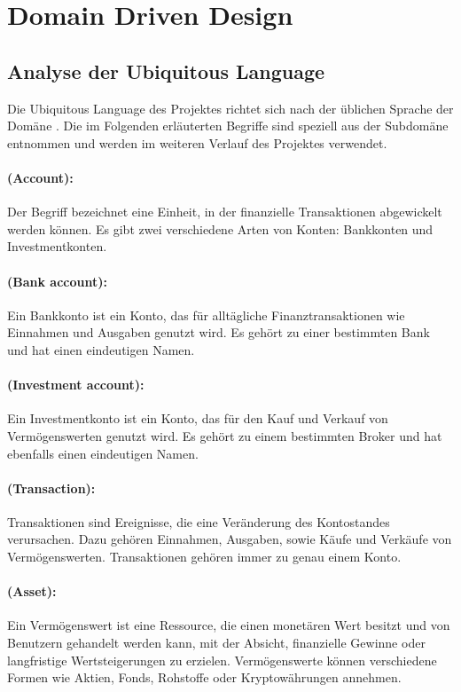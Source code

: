 \section{Domain Driven Design}

\subsection{Analyse der Ubiquitous Language}

Die Ubiquitous Language des Projektes richtet sich nach der üblichen Sprache der Domäne . Die im Folgenden erläuterten Begriffe sind speziell aus der Subdomäne  entnommen und werden im weiteren Verlauf des Projektes verwendet.

\paragraph*{ (Account):} Der Begriff bezeichnet eine Einheit, in der finanzielle Transaktionen abgewickelt werden können. Es gibt zwei verschiedene Arten von Konten: Bankkonten und Investmentkonten.

\paragraph*{ (Bank account):} Ein Bankkonto ist ein Konto, das für alltägliche Finanztransaktionen wie Einnahmen und Ausgaben genutzt wird. Es gehört zu einer bestimmten Bank und hat einen eindeutigen Namen.

\paragraph*{ (Investment account):}  Ein Investmentkonto ist ein Konto, das für den Kauf und Verkauf von Vermögenswerten genutzt wird. Es gehört zu einem bestimmten Broker und hat ebenfalls einen eindeutigen Namen.

\paragraph*{ (Transaction):} Transaktionen sind Ereignisse, die eine Veränderung des Kontostandes verursachen. Dazu gehören Einnahmen, Ausgaben, sowie Käufe und Verkäufe von Vermögenswerten. Transaktionen gehören immer zu genau einem Konto.

\paragraph*{ (Asset):} Ein Vermögenswert ist eine Ressource, die einen monetären Wert besitzt und von Benutzern gehandelt werden kann, mit der Absicht, finanzielle Gewinne oder langfristige Wertsteigerungen zu erzielen. Vermögenswerte können verschiedene Formen wie Aktien, Fonds, Rohstoffe oder Kryptowährungen annehmen.

